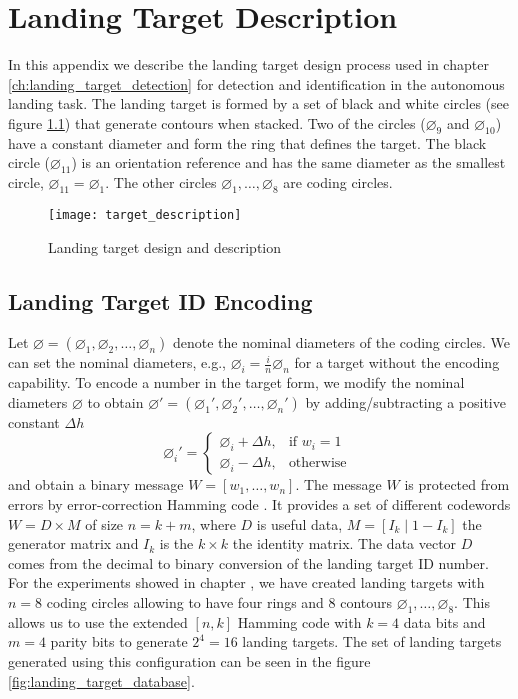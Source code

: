 
\chapter{Landing Target Description}\label{ch:target_description}
In this appendix we describe the landing target design process used in chapter \ref{ch:landing_target_detection} for detection and identification in the autonomous landing task. The landing target is formed by a set of black and white circles (see figure \ref{fig:target_description}) that generate contours when stacked. Two of the circles ($\diameter_{9}$ and $\diameter_{10}$) have a constant diameter and form the ring that defines the target. The black circle ($\diameter_{11}$) is an orientation reference and has the same diameter as the smallest circle, $\diameter_{11}=\diameter_{1}$. The other circles $\diameter_{1}, \ldots, \diameter_{8}$ are coding circles.


\begin{figure}[!ht]
\centering
\texttt{[image: target\_description]}
\caption{Landing target design and description}
\label{fig:target_description}
\end{figure}

\section{Landing Target ID Encoding}
Let $\varnothing=\left( \diameter_{1}, \diameter_{2},\ldots,\diameter_{n}\right) $ denote the nominal diameters of the coding circles. We can set the nominal diameters, e.g., $\diameter_{i}=\frac{i}{n}\diameter_{n}$ for a target without the encoding capability. To encode a number in the target form, we modify the nominal diameters $\varnothing$ to obtain $\varnothing'=\left( \diameter_{1}', \diameter_{2}',\ldots,\diameter_{n}'\right) $ by adding/subtracting a positive constant $\Delta h$
\begin{equation}
\diameter_{i}'=
\begin{cases}
  \diameter_{i}+\Delta h, & \text{if } w_{i}=1 \\
  \diameter_{i}- \Delta h, & \text{otherwise }
\end{cases}
\end{equation}
and obtain a binary message  $W=[w_{1}, \dots,w_{n}]$. The message $W$ is protected from errors by error-correction Hamming code  \citep{Hamming:BSTJ:1950}. It provides a set of different codewords $W= D\times M$ of size $n=k+m$, where $D$ is useful data, $ M=[I_{k}\mid 1-I_{k}]$ the generator matrix and $I_{k}$ is the $k\times k$ the identity matrix. The data vector $D$ comes from the decimal to binary conversion of the landing target ID number. For the experiments showed in chapter , we have created landing targets with $n=8$ coding circles allowing to have four rings and $8$ contours $\diameter_{1}, \ldots, \diameter_{8}$. This allows us to use the extended $[n,k]$ Hamming code with $k=4$ data bits and $m=4$ parity bits to generate $2^{4}=16$ landing targets. The set of landing targets generated using this configuration can be seen in the figure \ref{fig:landing_target_database}.

